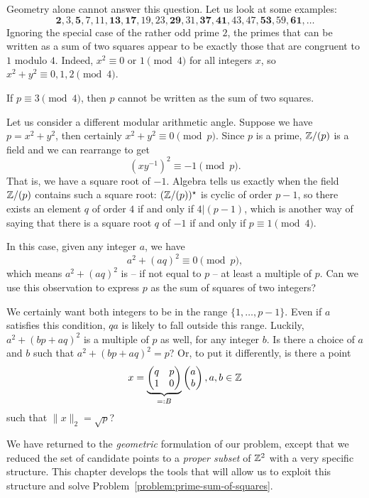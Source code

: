 Geometry alone cannot answer this question. Let us look at some examples:
\[ \mathbf{2}, 3, \mathbf{5}, 7, 11, \mathbf{13}, \mathbf{17}, 19, 23, \mathbf{29}, 31, \mathbf{37}, \mathbf{41}, 43, 47, \mathbf{53}, 59, \mathbf{61}, \dots \]
Ignoring the special case of the rather odd prime $2$,
the primes that can be written as a sum of two squares appear to be exactly those that are congruent to $1$ modulo $4$.
Indeed, $x^2 \equiv 0$ or $1 \pmod{4}$ for all integers $x$, so $x^2 + y^2 \equiv 0, 1, 2 \pmod{4}$.
\begin{fact}
  If $p \equiv 3 \pmod{4}$, then $p$ cannot be written as the sum of two squares.
\end{fact}
Let us consider a different modular arithmetic angle.
Suppose we have $p = x^2 + y^2$, then certainly $x^2 + y^2 \equiv 0 \pmod{p}$.
Since $p$ is a prime, $\mathbb{Z} / (p)$ is a field and we can rearrange to get
\[ (xy^{-1})^2 \equiv -1 \pmod{p}. \]
That is, we have a square root of $-1$.
Algebra tells us exactly when the field $\mathbb{Z}/(p)$ contains such a square root:
$(\mathbb{Z}/(p))^\star$ is cyclic of order $p-1$, so there exists an element $q$ of order $4$ if and only if $4 | (p - 1)$,
which is another way of saying that there is a square root $q$ of $-1$ if and only if $p \equiv 1 \pmod{4}$.

In this case, given any integer $a$, we have
\[ a^2 + (aq)^2 \equiv 0 \pmod{p}, \]
which means $a^2 + (aq)^2$ is -- if not equal to $p$ -- at least a multiple of $p$.
Can we use this observation to express $p$ as the sum of squares of two integers?

We certainly want both integers to be in the range $\{ 1, \dots, p - 1 \}$.
Even if $a$ satisfies this condition, $qa$ is likely to fall outside this range.
Luckily, $a^2 + (bp + aq)^2$ is a multiple of $p$ as well, for any integer $b$.
Is there a choice of $a$ and $b$ such that $a^2 + (bp + aq)^2 = p$?
Or, to put it differently, is there a point
\[
  x =
  \underbrace{\begin{pmatrix}
    q & p \\
    1 & 0
  \end{pmatrix}}_{=: B}
  \begin{pmatrix}
    a \\ b
  \end{pmatrix},
  a, b \in \mathbb{Z}
\]
such that $\|x\|_2 = \sqrt{p}$?

We have returned to the \emph{geometric} formulation of our problem,
except that we reduced the set of candidate points to a \emph{proper subset} of $\mathbb{Z}^2$ with a very specific structure.
This chapter develops the tools that will allow us to exploit this structure and solve Problem~\ref{problem:prime-sum-of-squares}.

